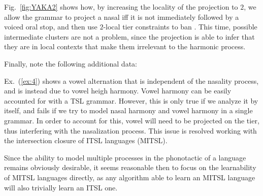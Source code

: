 Fig.~\ref{fig:YAKA2} shows how, by increasing the locality of the projection to $2$, we allow the grammar to project a nasal iff it is not immediately followed by a voiced oral stop, and then use $2$-local tier constraints to ban  .%
This time,  possible intermediate clusters are not a problem, since the projection is able to infer that they are in local contexts that make them irrelevant to the harmonic process.

Finally, note the following additional data:


\begin{exe}
    \ex\label{ex:4}\begin{xlist}
    	 \ex\label{ex:4a}    
	 \ex\label{ex:4b} 
	\end{xlist}
\end{exe}

Ex.~(\ref{ex:4}) shows a vowel alternation that is independent of the nasality process, and is instead due to vowel heigh harmony.
Vowel harmony can be easily accounted for with a TSL grammar.
However, this is only true if we analyze it by itself, and fails if we try to model nasal harmony and vowel harmony in a single grammar.
In order to account for this, vowel will need to be projected on the tier, thus interfering with the nasalization process.
This issue is resolved working with the intersection closure of ITSL languages (MITSL).

Since the ability to model multiple processes in the phonotactic of a language remains obviously desirable, it seems reasonable then to focus on the learnability of MITSL languages directly, as any algorithm able to learn an MITSL language will also trivially learn an ITSL one.